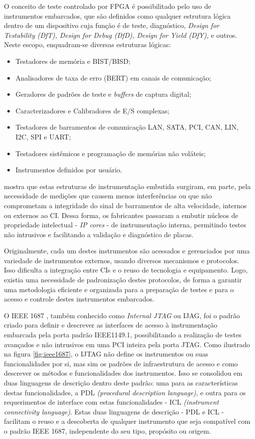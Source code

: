 O conceito de teste controlado por FPGA é possibilitado pelo uso de instrumentos embarcados, que são definidos como qualquer estrutura lógica dentro de um dispositivo cuja função é de teste, diagnóstico, \textit{Design for Testability (DfT), Design for Debug  (DfD), Design for Yield (DfY),} e outros. Neste escopo, enquadram-se diversas estruturas lógicas:    
\begin{itemize}
    \item Testadores de memória e BIST/BISD;
    \item Analisadores de taxa de erro (BERT) em canais de comunicação;
    \item Geradores de padrões de teste e \textit{buffers} de captura digital;
    \item Caracterizadores e Calibradores de E/S complexas;
    \item Testadores de barramentos de comunicação LAN, SATA, PCI, CAN, LIN, I2C, SPI e UART;
    \item Testadores sistêmicos e programação de memórias não voláteis;
    \item Instrumentos definidos por usuário.
\end{itemize}

\citet{Stollon2011} mostra que estas estruturas de instrumentação embutida surgiram, em parte, pela necessidade de medições que causem menos interferências ou que não comprometam a integridade do sinal de barramentos de alta velocidade, internos ou externos ao CI. Dessa forma, os fabricantes passaram a embutir núcleos de propriedade intelectual - \textit{IP cores} - de instrumentação interna, permitindo testes não intrusivos e facilitando a validação e diagnóstico de placas.

Originalmente, cada um destes instrumentos são acessados e gerenciados por uma variedade de instrumentos externos, usando diversos mecanismos e protocolos. Isso dificulta a integração entre CIs e o reuso de tecnologia e equipamento. Logo, existia uma necessidade de padronização destes protocolos, de forma a garantir uma metodologia eficiente e organizada para a preparação de testes e para o acesso e controle destes instrumentos embarcados. 

O IEEE 1687 \citep{ieee1687}, também conhecido como \textit{Internal JTAG } ou IJAG, foi o padrão criado para definir e descrever as interfaces de acesso à instrumentação embarcada pela porta padrão IEEE1149.1, possibilitando a realização de testes avançados e não intrusivos em uma PCI inteira pela porta JTAG. Como ilustrado na figura \ref{fig:ieee1687}, o IJTAG não define os instrumentos ou suas funcionalidades por si, mas sim os padrões de infraestrutura de acesso e como descrever os métodos e funcionalidades dos instrumentos. Isso se consolidou em duas linguagens de descrição dentro deste padrão: uma para as características destas funcionalidades, a PDL \textit{(procedural description language)}, e outra para os requerimentos de interface com estas funcionalidades - ICL \textit{(instrument connectivity language)}. Estas duas linguagens de descrição - PDL e ICL - facilitam o reuso e a descoberta de qualquer instrumento que seja compatível com o padrão IEEE 1687, independente do seu tipo, propósito ou origem. 


